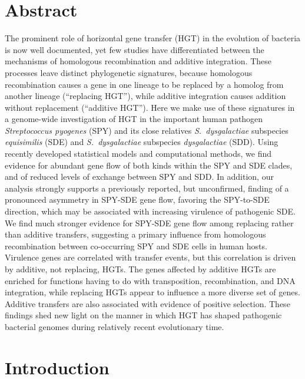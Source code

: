 \documentclass[12pt]{article}
\begin{document}
\doublespacing

\section*{Abstract}

The prominent role of horizontal gene transfer (HGT) in the evolution of
bacteria is now well documented, yet few studies have differentiated
between the mechanisms of homologous recombination and additive
integration.  These processes leave distinct phylogenetic signatures,
because homologous recombination causes a gene in one lineage to be
replaced by a homolog from another lineage (``replacing HGT''), while
additive integration causes addition without replacement (``additive
HGT'').  Here we make use of these signatures in a genome-wide
investigation of HGT in the important human pathogen {\em Streptococcus
  pyogenes} (SPY) and its close relatives {\em S.\ dysgalactiae} subspecies
{\em equisimilis} (SDE) and {\em S.\ dysgalactiae} subspecies {\em
  dysgalactiae} (SDD).  Using recently developed statistical models and
computational methods, we find evidence for abundant gene flow of both
kinds within the SPY and SDE clades, and of reduced levels of exchange
between SPY and SDD.  In addition, our analysis strongly supports a
previously reported, but unconfirmed, finding of a pronounced asymmetry in
SPY-SDE gene flow, favoring the SPY-to-SDE direction, which may be
associated with increasing virulence of pathogenic SDE.  We find much
stronger evidence for SPY-SDE gene flow among replacing rather than
additive transfers, suggesting a primary influence from homologous
recombination between co-occurring SPY and SDE cells in human hosts.
Virulence genes are correlated with transfer events, but this correlation
is driven by additive, not replacing, HGTs.  The genes affected by additive
HGTs are enriched for functions having to do with transposition,
recombination, and DNA integration, while replacing HGTs appear to
influence a more diverse set of genes.  Additive transfers are also
associated with evidence of positive selection.  These findings shed new
light on the manner in which HGT has shaped pathogenic bacterial genomes
during relatively recent evolutionary time.

\thispagestyle{empty}
\clearpage

\section*{Introduction}
\end{document}
